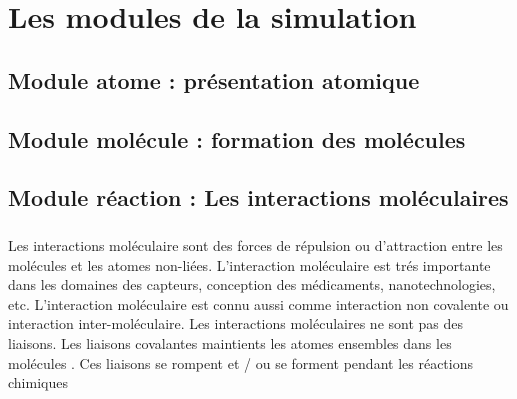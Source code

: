 
\chapter{Les modules de la simulation}
\label{les_modules_de_la_simulation}

\newcommand*{\mytextstyle}{\sffamily\Large\bfseries\color{black!85}}
\newcommand{\arcarrow}[3]{%
   \pgfmathsetmacro{\rin}{1.7}
   \pgfmathsetmacro{\rmid}{2.2}
   \pgfmathsetmacro{\rout}{2.7}
   \pgfmathsetmacro{\astart}{#1}
   \pgfmathsetmacro{\aend}{#2}
   \pgfmathsetmacro{\atip}{5}
   \fill[mygray, very thick] (\astart+\atip:\rin)
                         arc (\astart+\atip:\aend:\rin)
      -- (\aend-\atip:\rmid)
      -- (\aend:\rout)   arc (\aend:\astart+\atip:\rout)
      -- (\astart:\rmid) -- cycle;
   \path[
      decoration = {
         text along path,
         text = {|\mytextstyle|#3},
         text align = {align = center},
         raise = -1.0ex
      },
      decorate
   ](\astart+\atip:\rmid) arc (\astart+\atip:\aend+\atip:\rmid);
}
\section{ Module atome : présentation atomique }
\section{ Module molécule : formation des molécules}
\section{ Module réaction : Les interactions moléculaires}

\paragraph{}
Les interactions moléculaire sont des forces de répulsion ou d'attraction entre les molécules et les atomes non-liées. L'interaction moléculaire est trés importante dans les domaines des capteurs, conception des médicaments, nanotechnologies, etc. L'interaction moléculaire est connu aussi comme interaction non covalente ou interaction inter-moléculaire. Les interactions moléculaires ne sont pas des liaisons. Les liaisons covalantes  maintients les atomes ensembles dans les molécules . Ces liaisons se rompent et / ou se forment pendant les réactions chimiques 


